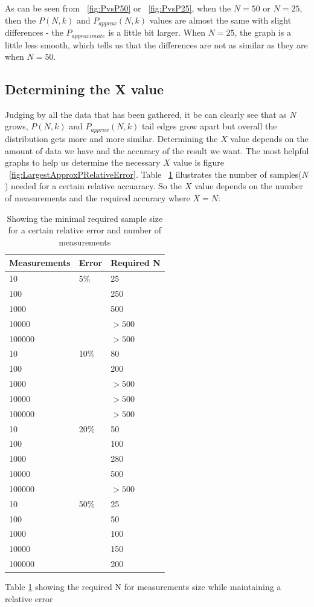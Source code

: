 \documentclass[12pt]{article}
\begin{document}
As can be seen from ~\ref{fig:PvsP50} or ~\ref{fig:PvsP25}, when the $N = 50$ or $N = 25$, then the $P(N, k)$ and $P_{approx}(N, k)$ values are almost the same with slight differences - the $P_{approximate}$ is a little bit larger. When $N = 25$, the graph is a little less smooth, which tells us that the differences are not as similar as they are when $N = 50$.

\subsection{Determining the X value}
Judging by all the data that has been gathered, it be can clearly see that as $N$ grows, $P(N, k)$ and $P_{approx}(N, k)$ tail edges grow apart but overall the distribution gets more and more similar. Determining the $X$ value depends on the amount of data we have and the accuracy of the result we want. The most helpful graphs to help us determine the necessary $X$ value is figure ~\ref{fig:LargestApproxPRelativeError}. Table ~\ref{table:requiredN} illustrates the number of samples($N$) needed for a certain relative accuaracy. So the $X$ value depends on the number of measurements and the required accuracy where $X = N$:

\begin{table}[!h]
	\begin{center}
		\caption{Showing the minimal required sample size for a certain relative error and number of measurements}
	    \begin{tabular}{| l | l | l |}
	    \hline
		Measurements & Error & Required N \\
		\hline
		10 & 5\% & 25 \\
		100 & & 250 \\
		1000 & & 500 \\
		10000 & & $>500$ \\
		100000 & & $> 500$ \\
		\hline
		10  & 10\% & 80 \\
		100 & & 200 \\
		1000 & & $>500$ \\
		10000 & & $>500$ \\
		100000  & & $>500$ \\
		\hline
		10  & 20\% & 50 \\
		100 & & 100 \\
		1000  & & 280 \\
		10000  & & 500 \\
		100000  & & $>500$ \\
		\hline
		10  & 50\% &  25 \\
		100 & & 50 \\
		1000 & & 100 \\
		10000 & & 150 \\
		100000 & & 200 \\
		\hline
		\end{tabular}
		\label{table:requiredN}
	\end{center}
\end{table}
Table \ref{table:requiredN} showing the required N for measurements size while maintaining a relative error
\end{document}
